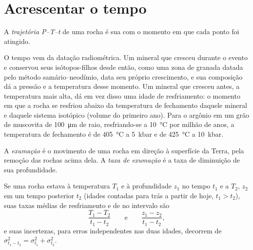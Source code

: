 \section{Acrescentar o tempo}\label{sec:b2:pt-paths:time}

\begin{definition}[Trajetória P--T--t]\label{def:b2:pt-paths:ptt}
A \emph{trajetória P--T--t} de uma rocha é sua  com o momento
em que cada ponto foi atingido.
\end{definition}

O tempo vem da datação radiométrica. Um mineral que cresceu durante o evento e conservou
seus isótopos-filhos desde então, como uma zona de granada datada pelo
método samário--neodímio, data seu próprio crescimento, e sua
composição dá a pressão e a temperatura desse momento. Um mineral que cresceu
antes, a temperatura mais alta, dá em vez disso uma idade de resfriamento: o momento em que a rocha
se resfriou abaixo da temperatura de fechamento daquele mineral e daquele sistema isotópico (volume do primeiro
ano). Para o argônio em um grão de muscovita de \qty{100}{\micro m} de raio, resfriando-se a
\qty{10}{\celsius} por milhão de anos, a temperatura de fechamento é de \qty{405}{\celsius} a
\qty{5}{kbar} e de \qty{425}{\celsius} a \qty{10}{kbar}.

\begin{definition}\label{def:b2:pt-paths:exhumation}
A \emph{exumação} é o movimento de uma rocha em direção à superfície da Terra,
pela remoção das rochas acima dela. A \emph{taxa de exumação} é a
taxa de diminuição de sua profundidade.
\end{definition}

\begin{proposition}\label{prop:b2:pt-paths:rates}
Se uma rocha estava à temperatura $T_1$ e à profundidade $z_1$ no tempo $t_1$ e a $T_2$, $z_2$ em um
tempo posterior $t_2$ (idades contadas para trás a partir de hoje, $t_1 > t_2$), suas taxas médias de resfriamento e de
 no intervalo são
\[
\frac{T_1 - T_2}{t_1 - t_2}
\qquad\text{e}\qquad
\frac{z_1 - z_2}{t_1 - t_2},
\]
e suas incertezas, para erros independentes nas duas idades, decorrem de
$\sigma_{t_1 - t_2}^2 = \sigma_{t_1}^2 + \sigma_{t_2}^2$.
\end{proposition}

